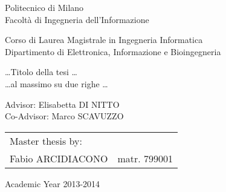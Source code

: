 \begin{titlepage}
\vspace*{-2.5cm}
\bfseries

\begin{center}
\LARGE
Politecnico di Milano\\
\Large
Facolt\`{a} di Ingegneria dell'Informazione\\
\vspace{0.5cm}

\begin{large}
Corso di Laurea Magistrale in Ingegneria Informatica\\
Dipartimento di Elettronica, Informazione e Bioingegneria\\
\end{large}

\vspace{1.0cm}
\begin{Large}
\dots Titolo della tesi \dots\\
\dots al massimo su due righe \dots
\end{Large}  
\end{center}

\vspace*{4.5cm}
\large
\begin{flushleft}
\hspace{-2cm}  Advisor: Elisabetta DI NITTO\\
\hspace{-2cm}  Co-Advisor: Marco SCAVUZZO\\
\end{flushleft}
\vspace*{1.5cm}

\hspace{5.5cm}
\parbox{10cm}{
    \begin{tabular}{ll}
         Master thesis by: & \\
         Fabio ARCIDIACONO & matr. 799001\\
    \end{tabular}
}

\vspace*{1.5cm}
\begin{center}
  Academic Year 2013-2014
\end{center}

\end{titlepage}
\cleardoublepage

\thispagestyle{empty}

